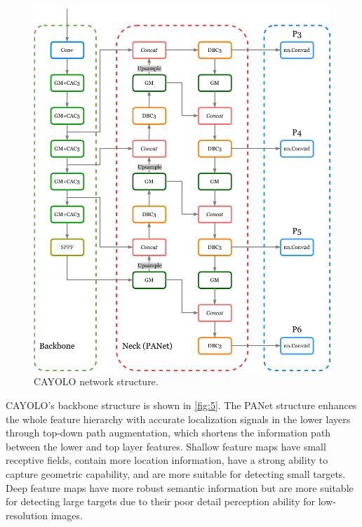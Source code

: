 \documentclass[sensors,article,submit,moreauthors]{Definitions/mdpi}
\begin{document}
    \begin{figure}[H]
        \includegraphics[width=\textwidth]{images/figure5}
        \caption{CAYOLO network structure.\label{fig:5}}
    \end{figure}


    CAYOLO's backbone structure is shown in \autoref{fig:5}. The PANet\citep{liu_2018_CVPR} structure enhances the whole feature hierarchy with accurate localization signals in the lower layers through top-down path augmentation, which shortens the information path between the lower and top layer features. Shallow feature maps have small receptive fields, contain more location information, have a strong ability to capture geometric capability, and are more suitable for detecting small targets. Deep feature maps have more robust semantic information but are more suitable for detecting large targets due to their poor detail perception ability for low-resolution images.
\end{document}
